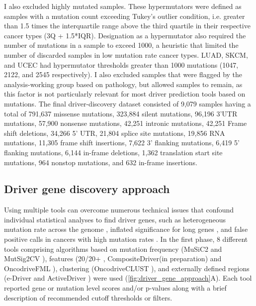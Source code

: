 I also excluded highly mutated samples. These hypermutators were defined as samples with a mutation count exceeding Tukey's outlier condition, i.e. greater than 1.5 times the interquartile range above the third quartile in their respective cancer types (3Q + 1.5*IQR). Designation as a hypermutator also required the number of mutations in a sample to exceed 1000, a heuristic that limited the number of discarded samples in low mutation rate cancer types. LUAD, SKCM, and UCEC had hypermutator thresholds greater than 1000 mutations (1047, 2122, and 2545 respectively). I also excluded samples that were flagged by the analysis-working group based on pathology, but allowed  samples to remain, as this factor is not particularly relevant for most driver prediction tools based on mutations. The final driver-discovery dataset consisted of 9,079 samples having a total of 791,637 missense mutations, 323,884 silent mutations, 96,196 3'UTR mutations, 57,900 nonsense mutations, 42,251 intronic mutations, 42,251 Frame shift deletions, 34,266 5' UTR, 21,804 splice site mutations, 19,856 RNA mutations, 11,305 frame shift insertions, 7,622 3' flanking mutations, 6,419 5' flanking mutations, 6,144 in-frame deletions, 1,362 translation start site mutations, 964 nonstop mutations, and 632 in-frame insertions.

\subsection{Driver gene discovery approach}
Using multiple tools can overcome numerous technical issues that confound individual statistical analyses to find driver genes, such as heterogeneous mutation rate across the genome \cite{RN13}, inflated significance for long genes \cite{RN169}, and false positive calls in cancers with high mutation rates \cite{RN70}. In the first phase, 8 different tools comprising algorithms based on mutation frequency (MuSiC2 \cite{RN43} and MutSig2CV \cite{RN14}), features (20/20+ \cite{RN70}, CompositeDriver(in preparation) and OncodriveFML \cite{RN86}), clustering (OncodriveCLUST \cite{RN54}), and externally defined regions (e-Driver \cite{RN153} and ActiveDriver \cite{RN98}) were used (\autoref{fig:driver_gene_approach}A). Each tool reported gene or mutation level scores and/or p-values along with a brief description of recommended cutoff thresholds or filters.

